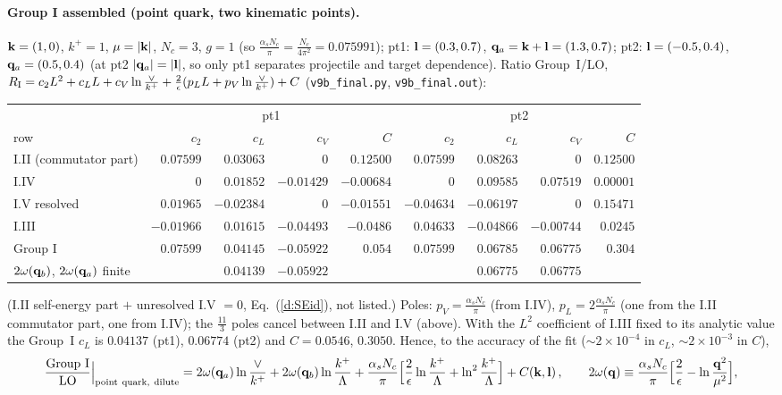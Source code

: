 \paragraph{Group I assembled (point quark, two kinematic points).} $\mathbf{k}=(1,0)$, $k^+=1$, $\mu=|\mathbf{k}|$, $N_c=3$, $g=1$ (so $\frac{\alpha_sN_c}{\pi}=\frac{N_c}{4\pi^2}=0.075991$); pt1: $\mathbf{l}=(0.3,0.7)$, $\mathbf{q}_a=\mathbf{k}+\mathbf{l}=(1.3,0.7)$; pt2: $\mathbf{l}=(-0.5,0.4)$, $\mathbf{q}_a=(0.5,0.4)$ (at pt2 $|\mathbf{q}_a|=|\mathbf{l}|$, so only pt1 separates projectile and target dependence). Ratio Group~I/LO, $R_{\rm I}=c_2L^2+c_LL+c_V\ln\frac\vee{k^+}+\frac2\epsilon(p_LL+p_V\ln\frac\vee{k^+})+C$ (\texttt{v9b\_final.py}, \texttt{v9b\_final.out}):
\begin{center}
\renewcommand{\arraystretch}{1.15}
\begin{tabular}{|l|rrrr|rrrr|}\hline
& \multicolumn{4}{c|}{pt1} & \multicolumn{4}{c|}{pt2}\\
row & $c_2$ & $c_L$ & $c_V$ & $C$ & $c_2$ & $c_L$ & $c_V$ & $C$\\\hline
I.II (commutator part) & $0.07599$ & $0.03063$ & $0$ & $0.12500$ & $0.07599$ & $0.08263$ & $0$ & $0.12500$\\
I.IV & $0$ & $0.01852$ & $-0.01429$ & $-0.00684$ & $0$ & $0.09585$ & $0.07519$ & $0.00001$\\
I.V resolved & $0.01965$ & $-0.02384$ & $0$ & $-0.01551$ & $-0.04634$ & $-0.06197$ & $0$ & $0.15471$\\
I.III & $-0.01966$ & $0.01615$ & $-0.04493$ & $-0.0486$ & $0.04633$ & $-0.04866$ & $-0.00744$ & $0.0245$\\\hline
Group I & $0.07599$ & $0.04145$ & $-0.05922$ & $0.054$ & $0.07599$ & $0.06785$ & $0.06775$ & $0.304$\\
$2\omega(\mathbf{q}_b)$, $2\omega(\mathbf{q}_a)$ finite & & $0.04139$ & $-0.05922$ & & & $0.06775$ & $0.06775$ & \\\hline
\end{tabular}
\end{center}
(I.II self-energy part $+$ unresolved I.V $=0$, Eq.~(\ref{d:SEid}), not listed.) Poles: $p_V=\frac{\alpha_sN_c}{\pi}$ (from I.IV), $p_L=2\frac{\alpha_sN_c}{\pi}$ (one from the I.II commutator part, one from I.IV); the $\frac{11}{3}$ poles cancel between I.II and I.V (above). With the $L^2$ coefficient of I.III fixed to its analytic value the Group~I $c_L$ is $0.04137$ (pt1), $0.06774$ (pt2) and $C=0.0546$, $0.3050$. Hence, to the accuracy of the fit ($\sim2\times10^{-4}$ in $c_L$, $\sim2\times10^{-3}$ in $C$),
\begin{align}
\frac{\text{Group I}}{\rm LO}\Big|_{\rm point\ quark,\ dilute}=2\omega(\v q_a)\ln\frac{\vee}{k^+}+2\omega(\v q_b)\ln\frac{k^+}{\Lambda}+\frac{\alpha_sN_c}{\pi}\Big[\frac2\epsilon\ln\frac{k^+}{\Lambda}+\ln^2\frac{k^+}{\Lambda}\Big]+C(\v k,\v l)\,,\qquad 2\omega(\v q)\equiv\frac{\alpha_sN_c}{\pi}\Big[\frac2\epsilon-\ln\frac{\v q^2}{\mu^2}\Big],\label{d:groupI}
\end{align}
